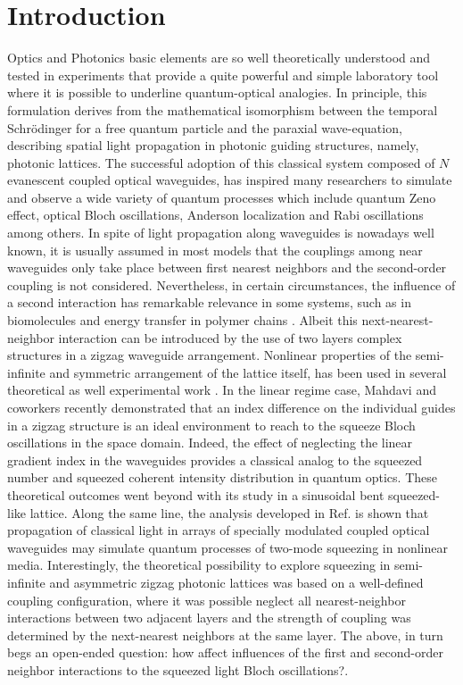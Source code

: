 \documentclass[12pt]{article}
\numberwithin{equation}{section}
\begin{document}
\section{Introduction}
Optics and Photonics basic elements are so well theoretically understood and tested in experiments that provide a quite powerful and simple laboratory tool where it is possible to underline quantum-optical analogies. In principle, this formulation derives from the mathematical isomorphism between the temporal Schrödinger for a free quantum particle and the paraxial wave-equation, describing spatial light propagation in photonic guiding structures, namely, photonic lattices. The successful adoption of this classical system composed of $N$ evanescent coupled optical waveguides, has inspired many researchers to simulate and observe a wide variety of quantum processes which include quantum Zeno effect\cite{1A,1.1A,1.2A}, optical Bloch oscillations\cite{2A,2.1A, 2.2A, 2.3A}, Anderson localization \cite{3A,3.1A,3.2A,3.3A} and Rabi oscillations\cite{4A,4.1A,4.2A} among others\cite{5A,5.1A,5.2A,5.3A,5.4A}. In spite of light propagation along waveguides is nowadays well known, it is usually assumed in most models that the couplings among near waveguides only take place between first nearest neighbors and the second-order coupling is not considered. Nevertheless, in certain circumstances, the influence of a second interaction has remarkable relevance in some systems, such as in biomolecules \cite{6A} and energy transfer in polymer chains \cite{7A}. Albeit this next-nearest-neighbor interaction can be introduced by the use of two layers complex structures in a zigzag waveguide arrangement\cite{8A,9A,10A}. Nonlinear properties of the semi-infinite and symmetric arrangement of the lattice itself, has been used in several theoretical as well experimental work \cite{8A,11A,12A}. In the linear regime case, Mahdavi and coworkers recently demonstrated that an index difference on the individual guides in a zigzag structure is an ideal environment to reach to the squeeze Bloch oscillations in the space domain. Indeed, the effect of neglecting the linear gradient index in the waveguides provides a classical analog to the squeezed number and squeezed coherent intensity distribution in quantum optics\cite{13A}. These theoretical outcomes went beyond with its study in a sinusoidal bent squeezed-like lattice\cite{14A}.
Along the same line, the analysis developed in Ref.\cite{15A} is shown that propagation of classical light in arrays of specially modulated coupled optical waveguides may simulate quantum processes of two-mode squeezing in nonlinear media. Interestingly, the theoretical possibility to explore squeezing in semi-infinite and asymmetric zigzag photonic lattices was based on a well-defined coupling configuration, where it was possible neglect all nearest-neighbor interactions between two adjacent layers and the strength of coupling was determined by the next-nearest neighbors at the same layer. The above, in turn begs an open-ended question: how affect influences of the first and second-order neighbor interactions to the squeezed light Bloch oscillations?. \\
\end{document}
